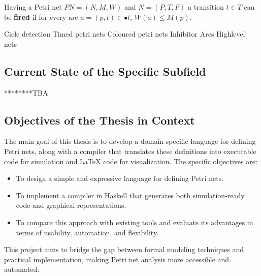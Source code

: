 \documentclass[12pt]{article}
\begin{document}
    Having a Petri net \(PN=(N,M,W)\) and \(N=(P,T,F)\) a transition \(t \in T\) can be \textbf{fired} if for every arc \(a=(p,t) \in \bullet t\), \(W(a) \le M(p)\). \cite{diaz2013petri}
        
    
        Cicle detection
        Timed petri nets
        Coloured petri nets
        Inhibitor Arcs
        Highlevel nets
    
    \subsection{Current State of the Specific Subfield}
    ********TBA
    \subsection{Objectives of the Thesis in Context}
    The main goal of this thesis is to develop a domain-specific language for defining Petri nets, along with a compiler that translates these definitions into executable code for simulation and LaTeX code for visualization. The specific objectives are:
    \begin{itemize}
        \item To design a simple and expressive language for defining Petri nets.
        \item To implement a compiler in Haskell that generates both simulation-ready code and graphical representations.
        \item To compare this approach with existing tools and evaluate its advantages in terms of usability, automation, and flexibility.
    \end{itemize}
    This project aims to bridge the gap between formal modeling techniques and practical implementation, making Petri net analysis more accessible and automated.
    
    
\end{document}
